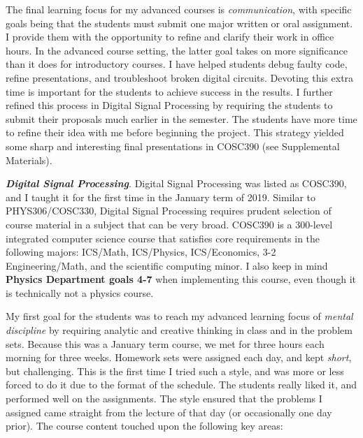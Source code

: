 \documentclass[../../../main.tex]{subfiles}
\begin{document}
The final learning focus for my advanced courses is \textit{communication}, with specific goals being that the students must submit one major written or oral assignment.  I provide them with the opportunity to refine and clarify their work in office hours.  In the advanced course setting, the latter goal takes on more significance than it does for introductory courses.  I have helped students debug faulty code, refine presentations, and troubleshoot broken digital circuits.  Devoting this extra time is important for the students to achieve success in the results.  I further refined this process in Digital Signal Processing by requiring the students to submit their proposals much earlier in the semester.  The students have more time to refine their idea with me before beginning the project.  This strategy yielded some sharp and interesting final presentations in COSC390 (see Supplemental Materials).  \\ \hspace{0.1cm}

\textbf{\textit{Digital Signal Processing}}.  Digital Signal Processing was listed as COSC390, and I taught it for the first time in the January term of 2019.  Similar to PHYS306/COSC330, Digital Signal Processing requires prudent selection of course material in a subject that can be very broad.  COSC390 is a 300-level integrated computer science course that satisfies core requirements in the following majors: ICS/Math, ICS/Physics, ICS/Economics, 3-2 Engineering/Math, and the scientific computing minor.  I also keep in mind \textbf{Physics Department goals 4-7} when implementing this course, even though it is technically not a physics course.  \\ \hspace{0.1cm}

My first goal for the students was to reach my advanced learning focus of \textit{mental discipline} by requiring analytic and creative thinking in class and in the problem sets.  Because this was a January term course, we met for three hours each morning for three weeks.  Homework sets were assigned each day, and kept \textit{short}, but challenging.  This is the first time I tried such a style, and was more or less forced to do it due to the format of the schedule.  The students really liked it, and performed well on the assignments.  The style ensured that the problems I assigned came straight from the lecture of that day (or occasionally one day prior).  The course content touched upon the following key areas:
\end{document}
